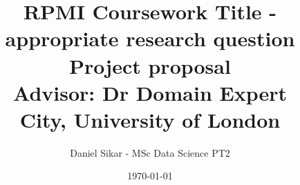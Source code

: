 \documentclass[12pt]{article} %
\begin{document}
\title{%
  RPMI Coursework Title - appropriate research question \\
  \large Project proposal \\
    Advisor: Dr Domain Expert \\
    City, University of London}
\author{Daniel Sikar - MSc Data Science PT2}
\date{\today} %

\maketitle %



% 










\end{document}

